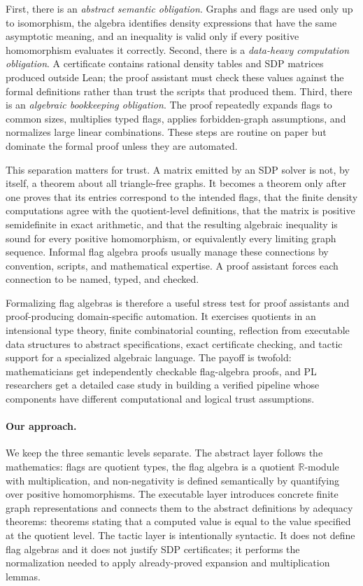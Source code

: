 \documentclass{article}
\begin{document}
First, there is an \emph{abstract semantic obligation}.  Graphs and flags are
used only up to isomorphism, the algebra identifies density expressions that
have the same asymptotic meaning, and an inequality is valid only if every
positive homomorphism evaluates it correctly.  Second, there is a
\emph{data-heavy computation obligation}.  A certificate contains rational
density tables and SDP matrices produced outside Lean; the proof assistant
must check these values against the formal definitions rather than trust the
scripts that produced them.  Third, there is an \emph{algebraic bookkeeping
obligation}.  The proof repeatedly expands flags to common sizes, multiplies
typed flags, applies forbidden-graph assumptions, and normalizes large linear
combinations.  These steps are routine on paper but dominate the formal proof
unless they are automated.

This separation matters for trust.  A matrix emitted by an SDP solver is not,
by itself, a theorem about all triangle-free graphs.  It becomes a theorem
only after one proves that its entries correspond to the intended flags, that
the finite density computations agree with the quotient-level definitions,
that the matrix is positive semidefinite in exact arithmetic, and that the
resulting algebraic inequality is sound for every positive homomorphism, or
equivalently every limiting graph sequence.  Informal flag algebra proofs
usually manage these connections by convention, scripts, and mathematical
expertise.  A proof assistant forces each connection to be named, typed, and
checked.

Formalizing flag algebras is therefore a useful stress test for proof
assistants and proof-producing domain-specific automation.  It exercises
quotients in an intensional type theory, finite combinatorial counting,
reflection from executable data structures to abstract specifications, exact
certificate checking, and tactic support for a specialized algebraic language.
The payoff is twofold: mathematicians get independently checkable
flag-algebra proofs, and PL researchers get a detailed case study in building
a verified pipeline whose components have different computational and logical
trust assumptions.

\paragraph{Our approach.}
We keep the three semantic levels separate.  The abstract layer follows the
mathematics: flags are quotient types, the flag algebra is a quotient
$\mathbb{R}$-module with multiplication, and non-negativity is defined
semantically by quantifying over positive homomorphisms.  The executable
layer introduces concrete finite graph representations and connects them to
the abstract definitions by adequacy theorems: theorems stating that a
computed value is equal to the value specified at the quotient level.  The
tactic layer is intentionally syntactic.  It does not define flag algebras
and it does not justify SDP certificates; it performs the normalization needed
to apply already-proved expansion and multiplication lemmas.
\end{document}
